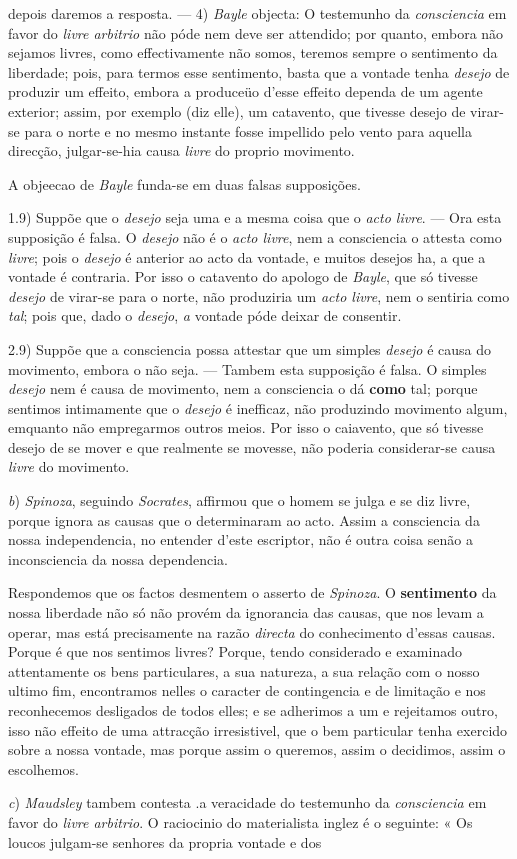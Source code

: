 depois daremos a resposta. --- 4) \emph{Bayle} objecta: O testemunho da \emph{consciencia} em favor do \emph{livre arbitrio} não póde nem deve ser attendido; por quanto, embora não sejamos livres, como effectivamente não somos, teremos sempre o sentimento da liberdade; pois, para termos esse sentimento, basta que a vontade tenha \emph{desejo} de produzir um effeito, embora a produceüo d'esse effeito dependa de um agente exterior; assim, por exemplo (diz elle), um catavento, que tivesse desejo de virar-se para o norte e no mesmo instante fosse impellido pelo vento para aquella direcção, julgar-se-hia causa \emph{livre} do proprio movimento.\par A objeecao de \emph{Bayle} funda-se em duas falsas supposições.\par 1.9) Suppõe que o \emph{desejo} seja uma e a mesma coisa que o \emph{acto livre}. --- Ora esta supposição é falsa. O \emph{desejo} não é o \emph{acto livre}, nem a consciencia o attesta como \emph{livre}; pois o \emph{desejo} é anterior ao acto da vontade, e muitos desejos ha, a que a vontade é contraria. Por isso o catavento do apologo de \emph{Bayle}, que só tivesse \emph{desejo} de virar-se para o norte, não produziria um \emph{acto livre}, nem o sentiria como \emph{tal}; pois que, dado o \emph{desejo}, \emph{a} vontade póde deixar de consentir.\par 2.9) Suppõe que a consciencia possa attestar que um simples \emph{desejo} é causa do movimento, embora o não seja. --- Tambem esta supposição é falsa. O simples \emph{desejo} nem é causa de movimento, nem a consciencia o dá \textbf{como} tal; porque sentimos intimamente que o \emph{desejo} é inefficaz, não produzindo movimento algum, emquanto não empregarmos outros meios. Por isso o caiavento, que só tivesse desejo de se mover e que realmente se movesse, não poderia considerar-se causa \emph{livre} do movimento.\par \emph{b}) \emph{Spinoza}, seguindo \emph{Socrates}, affirmou que o homem se julga e se diz livre, porque ignora as causas que o determinaram ao acto. Assim a consciencia da nossa independencia, no entender d'este escriptor, não é outra coisa senão a inconsciencia da nossa dependencia.\par Respondemos que os factos desmentem o asserto de \emph{Spinoza}. O \textbf{sentimento} da nossa liberdade não só não provém da ignorancia das causas, que nos levam a operar, mas está precisamente na razão \emph{directa} do conhecimento d'essas causas. Porque é que nos sentimos livres? Porque, tendo considerado e examinado attentamente os bens particulares, a sua natureza, a sua relação com o nosso ultimo fim, encontramos nelles o caracter de contingencia e de limitação e nos reconhecemos desligados de todos elles; e se adherimos a um e rejeitamos outro, isso não effeito de uma attracção irresistivel, que o bem particular tenha exercido sobre a nossa vontade, mas porque assim o queremos, assim o decidimos, assim o escolhemos.\par \emph{c}) \emph{Maudsley} tambem contesta .a veracidade do testemunho da \emph{consciencia} em favor do \emph{livre arbitrio}. O raciocinio do materialista inglez é o seguinte: « Os loucos julgam-se senhores da propria vontade e dos 